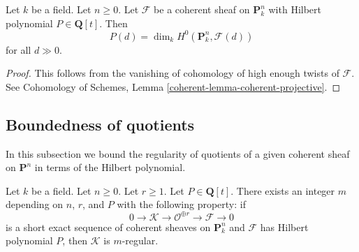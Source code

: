 \begin{lemma}
\label{lemma-hilbert-polynomial-H0}
Let $k$ be a field. Let $n \geq 0$. Let $\mathcal{F}$ be a coherent sheaf
on $\mathbf{P}^n_k$ with Hilbert polynomial $P \in \mathbf{Q}[t]$.
Then
$$
P(d) = \dim_k H^0(\mathbf{P}^n_k, \mathcal{F}(d))
$$
for all $d \gg 0$.
\end{lemma}

\begin{proof}
This follows from the vanishing of cohomology of high enough twists
of $\mathcal{F}$. See
Cohomology of Schemes,
Lemma \ref{coherent-lemma-coherent-projective}.
\end{proof}



\subsection{Boundedness of quotients}
\label{subsection-boundedness}

\noindent
In this subsection we bound the regularity of quotients of
a given coherent sheaf on $\mathbf{P}^n$ in terms of the
Hilbert polynomial.

\begin{lemma}
\label{lemma-bound-quotients-free}
Let $k$ be a field. Let $n \geq 0$. Let $r \geq 1$. Let $P \in \mathbf{Q}[t]$.
There exists an integer $m$ depending on $n$, $r$, and $P$
with the following property: if
$$
0 \to \mathcal{K} \to \mathcal{O}^{\oplus r} \to \mathcal{F} \to 0
$$
is a short exact sequence of coherent sheaves on $\mathbf{P}^n_k$
and $\mathcal{F}$ has Hilbert polynomial $P$, then
$\mathcal{K}$ is $m$-regular.
\end{lemma}

